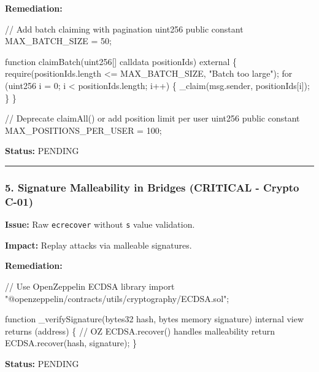 \documentclass[
]{article}
\newenvironment{Shaded}{}{}
\newcommand{\NormalTok}[1]{#1}
\begin{document}
\textbf{Remediation:}

\begin{Shaded}
\begin{Highlighting}[]
\NormalTok{// Add batch claiming with pagination}
\NormalTok{uint256 public constant MAX\_BATCH\_SIZE = 50;}

\NormalTok{function claimBatch(uint256[] calldata positionIds) external \{}
\NormalTok{    require(positionIds.length \textless{}= MAX\_BATCH\_SIZE, "Batch too large");}
\NormalTok{    for (uint256 i = 0; i \textless{} positionIds.length; i++) \{}
\NormalTok{        \_claim(msg.sender, positionIds[i]);}
\NormalTok{    \}}
\NormalTok{\}}

\NormalTok{// Deprecate claimAll() or add position limit per user}
\NormalTok{uint256 public constant MAX\_POSITIONS\_PER\_USER = 100;}
\end{Highlighting}
\end{Shaded}

\textbf{Status:} PENDING

\begin{center}\rule{0.5\linewidth}{0.5pt}\end{center}

\subsubsection{5. Signature Malleability in Bridges (CRITICAL - Crypto
C-01)}\label{5-signature-malleability-in-bridges-critical---crypto-c-01}

\textbf{Issue:} Raw \texttt{ecrecover} without \texttt{s} value
validation.

\textbf{Impact:} Replay attacks via malleable signatures.

\textbf{Remediation:}

\begin{Shaded}
\begin{Highlighting}[]
\NormalTok{// Use OpenZeppelin ECDSA library}
\NormalTok{import "@openzeppelin/contracts/utils/cryptography/ECDSA.sol";}

\NormalTok{function \_verifySignature(bytes32 hash, bytes memory signature) internal view returns (address) \{}
\NormalTok{    // OZ ECDSA.recover() handles malleability}
\NormalTok{    return ECDSA.recover(hash, signature);}
\NormalTok{\}}
\end{Highlighting}
\end{Shaded}

\textbf{Status:} PENDING
\end{document}
